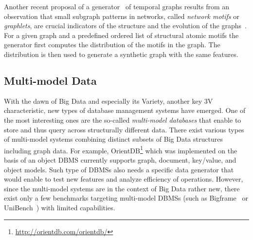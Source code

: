 Another recent proposal of a generator~\cite{mlg2018_42} of temporal graphs
results from an observation that small subgraph patterns in networks, called
\emph{network motifs} or \emph{graphlets}, are crucial indicators of the
structure and the evolution of the
graphs~\cite{Paranjape:2017:MTN:3018661.3018731}. For a given graph and a
predefined ordered list of structural atomic motifs the generator first computes
the distribution of the motifs in the graph. The distribution is then used to
generate a synthetic graph with the same features.




\subsection{Multi-model Data}
With the dawn of Big Data and especially its Variety, another key 3V characteristic, new types of
database management systems have emerged. One of the most interesting ones
are the so-called \emph{multi-model databases} that enable to store and
thus query across structurally different data. There exist various types of
multi-model systems combining  distinct subsets of Big Data structures including graph data.
For example, OrientDB\footnote{\url{http://orientdb.com/orientdb/}} which was
implemented on the basis of an object DBMS currently supports graph, document,
key/value, and object models. Such type of DBMSs also needs a specific
data generator that would enable
to test new features and analyze efficiency of operations. However, since the
multi-model systems are in the context of Big Data rather new, there exist only
a few benchmarks targeting multi-model DBMSs (such as
Bigframe~\cite{journals/pvldb/KunjirKB14} or UniBench~\cite{conf/cidr/lu17})
with limited capabilities.


